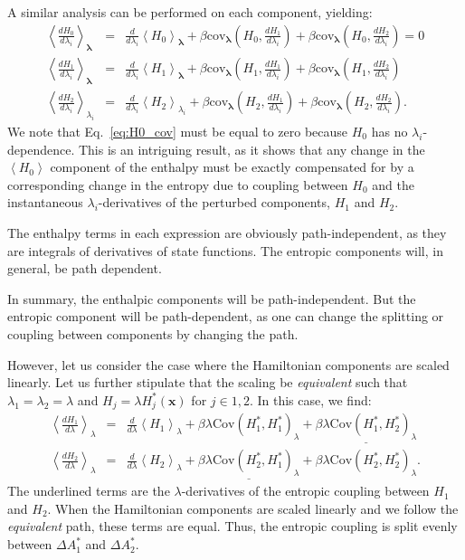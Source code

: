 \documentclass[%
 preprint,
 amsmath,amssymb,
 aps,
]{revtex4-1}
\renewcommand{\vec}[1]{{\bm{#1}}}
\begin{document}
A similar analysis can be performed on each component, yielding:
\begin{eqnarray}
\left<\frac{dH_0}{d\lambda_i}\right>_{\vec\lambda} &=& 
\frac{d}{d\lambda_i}\left<H_0\right>_{\vec\lambda} +
\beta\mathrm{cov}_{\vec\lambda}\left(H_0, \frac{dH_1}{d\lambda_i} \right)+
\beta\mathrm{cov}_{\vec\lambda}\left(H_0, \frac{dH_2}{d\lambda_i} \right)
\label{eq:H0_cov}=0\\
\left<\frac{dH_1}{d\lambda_i}\right>_{\vec\lambda} &=& 
\frac{d}{d\lambda_i}\left<H_1\right>_{\vec\lambda} +
\beta\mathrm{cov}_{\vec\lambda}\left(H_1, \frac{dH_1}{d\lambda_i} \right)+
\beta\mathrm{cov}_{\vec\lambda}\left(H_1, \frac{dH_2}{d\lambda_i} \right)\\
\left<\frac{dH_2}{d\lambda_i}\right>_{\lambda_i} &=& 
\frac{d}{d\lambda_i}\left<H_2\right>_{\lambda_i} +
\beta\mathrm{cov}_{\vec\lambda}\left(H_2, \frac{dH_1}{d\lambda_i} \right)+
\beta\mathrm{cov}_{\vec\lambda}\left(H_2, \frac{dH_2}{d\lambda_i} \right).
\end{eqnarray}
We note that Eq.~\ref{eq:H0_cov} must be equal to zero because $H_0$ has no $\lambda_i$-dependence. This is an intriguing result, as it shows that any change in the $\left<H_0\right>$ component of the enthalpy must be exactly compensated for by a corresponding change in the entropy due to coupling between $H_0$ and the instantaneous $\lambda_i$-derivatives of the perturbed components, $H_1$ and $H_2$.

The enthalpy terms in each expression are obviously path-independent, as they are integrals of derivatives of state functions. The entropic components will, in general, be path dependent.

In summary, the enthalpic components will be path-independent. But the entropic component will be path-dependent, as one can change the splitting or coupling between components by changing the path.

However, let us consider the case where the Hamiltonian components are scaled linearly. Let us further stipulate that the scaling be \emph{equivalent} such that $\lambda_1 = \lambda_2 = \lambda$ and $H_j = \lambda H_j^*(\vec x)$ for $j\in{1,2}$. In this case, we find:
\begin{eqnarray}
\left<\frac{dH_1}{d\lambda}\right>_\lambda &=& 
\frac{d}{d\lambda}\left<H_1\right>_\lambda +
\beta\lambda\mathrm{Cov}\left(H_1^*,H_1^*\right)_\lambda+
\underline{\beta\lambda\mathrm{Cov}\left(H_1^*,H_2^*\right)_\lambda}\\
\left<\frac{dH_2}{d\lambda}\right>_\lambda &=& 
\frac{d}{d\lambda}\left<H_2\right>_\lambda +
\underline{\beta\lambda\mathrm{Cov}\left(H_2^*,H_1^* \right)_\lambda}+
\beta\lambda\mathrm{Cov}\left(H_2^*, H_2^* \right)_\lambda.
\end{eqnarray}
The underlined terms are the $\lambda$-derivatives of the entropic coupling between $H_1$ and $H_2$. When the Hamiltonian components are scaled linearly and we follow the \emph{equivalent} path, these terms are equal. Thus, the entropic coupling is split evenly between $\Delta A^*_1$ and $\Delta A^*_2$.
\end{document}
